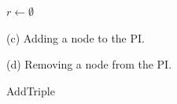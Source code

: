 \documentclass[abstracton,12pt]{scrreprt}
\begin{document}
\begin{figure}
\begin{multicols}{2}
\begin{algorithm}[H]
\begin{scriptsize}
{{{                        }
                    }
                    $r \longleftarrow \emptyset$\;
                    \;
                }
            \end{scriptsize}
        \end{algorithm}
    \end{multicols}
    \begin{multicols}{2}
        \begin{center}(c) Adding a node to the PI.\end{center}

        \begin{algorithm}[H]
            \label{algo:add_triple}
            \caption{AddTriple}
            \DontPrintSemicolon
            \begin{scriptsize}
                \vspace{2.2mm}
            \end{scriptsize}
        \end{algorithm}
        \columnbreak
        \begin{center}(d) Removing a node from the PI.\end{center}


\end{multicols}
\end{figure}
\end{document}
